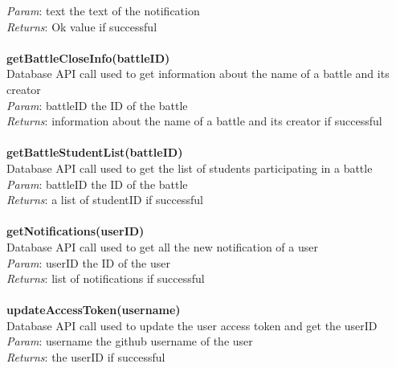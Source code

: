 \documentclass{article}
\begin{document}
\textit{Param}: text the text of the notification\\
\textit{Returns}: Ok value if successful\\
\\
\textbf{getBattleCloseInfo(battleID)}\\
Database API call used to get information about the name of a battle and its creator\\
\textit{Param}: battleID the ID of the battle\\
\textit{Returns}: information about the name of a battle and its creator if successful\\
\\
\textbf{getBattleStudentList(battleID)}\\
Database API call used to get the list of students participating in a battle\\
\textit{Param}: battleID the ID of the battle\\
\textit{Returns}: a list of studentID if successful\\
\\
\textbf{getNotifications(userID)}\\
Database API call used to get all the new notification of a user\\
\textit{Param}: userID the ID of the user\\
\textit{Returns}: list of notifications if successful\\
\\
\textbf{updateAccessToken(username)}\\
Database API call used to update the user access token and get the userID\\
\textit{Param}: username the github username of the user\\
\textit{Returns}: the userID if successful\\
\end{document}
